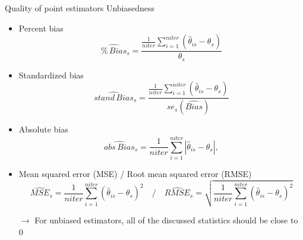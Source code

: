 \documentclass[aspectratio=169]{beamer}
\begin{document}
\begin{frame}{Quality of point estimators}
{Unbiasedness}
\vspace{0.2cm}
\footnotesize
\begin{itemize}
  \item Percent bias
  \begin{equation*}
  \widehat{\%\,Bias}_s = \dfrac{\frac{1}{niter}{\sum_{i = 1}^{niter} (\hat{\theta}_{is} - \theta_s)}}{\theta_s}
  \end{equation*}
  \item Standardized bias
  \begin{equation*}
\widehat{stand\,Bias}_s = \dfrac{\frac{1}{niter}{\sum_{i = 1}^{niter} (\hat{\theta}_{is} - \theta_s)}}{se_s\left(\widehat{Bias}\right)}
  \end{equation*}
  \item Absolute bias
  \begin{equation*}
\widehat{abs\,Bias}_s = \frac{1}{niter}{\sum_{i = 1}^{niter} |\hat{\theta}_{is} - \theta_s|},
  \end{equation*}
  \item Mean squared error (MSE) / Root mean squared error (RMSE)
  \begin{equation*}
\widehat{MSE}_s = \frac{1}{niter}{\sum_{i = 1}^{niter} (\hat{\theta}_{is} -
    \theta_s)^2} \quad/\quad \widehat{RMSE}_s = \sqrt{\frac{1}{niter}{\sum_{i = 1}^{niter} (\hat{\theta}_{is} - \theta_s)^2}}
  \end{equation*}
\item[$\to$] For unbiased estimators, all of the discussed statistics should be
  close to 0
\end{itemize}
\end{frame}
\end{document}
